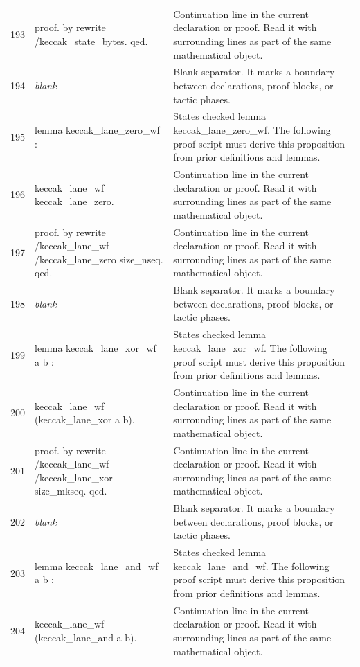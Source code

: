 \documentclass[10pt]{article}
\begin{document}
\begin{longtable}{r L{0.53\textwidth} L{0.37\textwidth}}
193 & {\ttfamily\scriptsize proof. by rewrite /keccak\_state\_bytes. qed.} & Continuation line in the current declaration or proof.  Read it with surrounding lines as part of the same mathematical object. \\
194 & {\ttfamily\scriptsize \emph{blank}} & Blank separator.  It marks a boundary between declarations, proof blocks, or tactic phases. \\
195 & {\ttfamily\scriptsize lemma keccak\_lane\_zero\_wf :} & States checked lemma keccak\_lane\_zero\_wf.  The following proof script must derive this proposition from prior definitions and lemmas. \\
196 & {\ttfamily\scriptsize   keccak\_lane\_wf keccak\_lane\_zero.} & Continuation line in the current declaration or proof.  Read it with surrounding lines as part of the same mathematical object. \\
197 & {\ttfamily\scriptsize proof. by rewrite /keccak\_lane\_wf /keccak\_lane\_zero size\_nseq. qed.} & Continuation line in the current declaration or proof.  Read it with surrounding lines as part of the same mathematical object. \\
198 & {\ttfamily\scriptsize \emph{blank}} & Blank separator.  It marks a boundary between declarations, proof blocks, or tactic phases. \\
199 & {\ttfamily\scriptsize lemma keccak\_lane\_xor\_wf a b :} & States checked lemma keccak\_lane\_xor\_wf.  The following proof script must derive this proposition from prior definitions and lemmas. \\
200 & {\ttfamily\scriptsize   keccak\_lane\_wf (keccak\_lane\_xor a b).} & Continuation line in the current declaration or proof.  Read it with surrounding lines as part of the same mathematical object. \\
201 & {\ttfamily\scriptsize proof. by rewrite /keccak\_lane\_wf /keccak\_lane\_xor size\_mkseq. qed.} & Continuation line in the current declaration or proof.  Read it with surrounding lines as part of the same mathematical object. \\
202 & {\ttfamily\scriptsize \emph{blank}} & Blank separator.  It marks a boundary between declarations, proof blocks, or tactic phases. \\
203 & {\ttfamily\scriptsize lemma keccak\_lane\_and\_wf a b :} & States checked lemma keccak\_lane\_and\_wf.  The following proof script must derive this proposition from prior definitions and lemmas. \\
204 & {\ttfamily\scriptsize   keccak\_lane\_wf (keccak\_lane\_and a b).} & Continuation line in the current declaration or proof.  Read it with surrounding lines as part of the same mathematical object. \\

\end{longtable}
\end{document}
